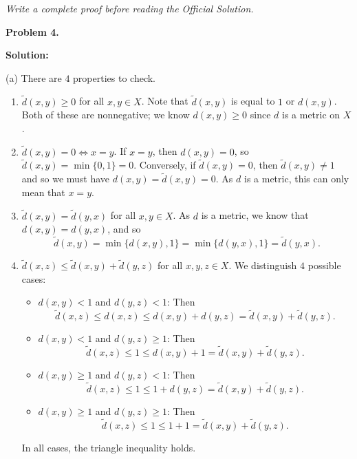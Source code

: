 \documentclass[12pt]{article}
\newcommand{\writespace}[1]{\vspace{#1}}
\begin{document}
\newpage

\begin{tcolorbox}[
  enhanced, breakable,
  colback  = pass5gray,
  colframe = black!38,
  fonttitle = \bfseries,
  title = {Pass 5 \enspace\textbf{--}\enspace Full Proof Attempt}
]
\small\itshape Write a complete proof before reading the Official Solution.\par
\normalfont\normalsize
\writespace{19cm}
\end{tcolorbox}

\newpage

\begin{tcolorbox}[
  enhanced, breakable,
  colback  = solgreen,
  colframe = green!45!black,
  fonttitle = \bfseries,
  title = {\textsc{Official Solution}\hfill Homework 8 -- Selected Solutions}
]
\textbf{Problem 4.}

\medskip\textbf{Solution:}

\medskip
(a) There are $4$ properties to check.
\begin{enumerate}[leftmargin=1.8em, itemsep=4pt]
  \item $\tilde{d}(x, y) \ge 0$ for all $x, y \in X$. Note that $\tilde{d}(x, y)$ is equal to $1$ or
    $d(x, y)$. Both of these are nonnegative; we know $d(x, y) \ge 0$ since $d$ is a metric on $X$.
  \item $\tilde{d}(x, y) = 0 \Longleftrightarrow x = y$. If $x = y$, then $d(x, y) = 0$, so
    $\tilde{d}(x, y) = \min\{0, 1\} = 0$. Conversely, if $\tilde{d}(x, y) = 0$, then
    $\tilde{d}(x, y) \ne 1$ and so we must have $d(x, y) = \tilde{d}(x, y) = 0$. As $d$ is a metric,
    this can only mean that $x = y$.
  \item $\tilde{d}(x, y) = \tilde{d}(y, x)$ for all $x, y \in X$. As $d$ is a metric, we know that
    $d(x, y) = d(y, x)$, and so
\[
  \tilde{d}(x, y) = \min\{d(x, y), 1\} = \min\{d(y, x), 1\} = \tilde{d}(y, x).
\]
  \item $\tilde{d}(x, z) \le \tilde{d}(x, y) + \tilde{d}(y, z)$ for all $x, y, z \in X$. We distinguish
    $4$ possible cases:
\begin{itemize}[nosep, leftmargin=1.5em]
  \item $d(x, y) < 1$ and $d(y, z) < 1$: Then
\[
  \tilde{d}(x, z) \le d(x, z) \le d(x, y) + d(y, z) = \tilde{d}(x, y) + \tilde{d}(y, z).
\]
  \item $d(x, y) < 1$ and $d(y, z) \ge 1$: Then
\[
  \tilde{d}(x, z) \le 1 \le d(x, y) + 1 = \tilde{d}(x, y) + \tilde{d}(y, z).
\]
  \item $d(x, y) \ge 1$ and $d(y, z) < 1$: Then
\[
  \tilde{d}(x, z) \le 1 \le 1 + d(y, z) = \tilde{d}(x, y) + \tilde{d}(y, z).
\]
  \item $d(x, y) \ge 1$ and $d(y, z) \ge 1$: Then
\[
  \tilde{d}(x, z) \le 1 \le 1 + 1 = \tilde{d}(x, y) + \tilde{d}(y, z).
\]
\end{itemize}
In all cases, the triangle inequality holds.
\end{enumerate}


\end{tcolorbox}
\end{document}

